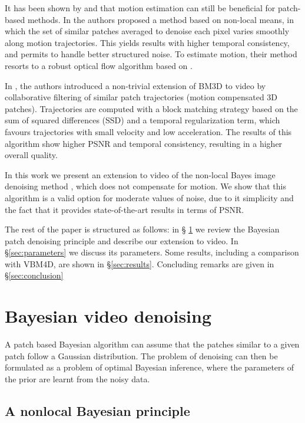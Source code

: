 \documentclass{llncs}
\begin{document}
It has been shown by \cite{Liu2010} and \cite{Maggioni2011,Maggioni2012} that motion estimation can still be
beneficial for patch-based methods. 
%
In \cite{Liu2010} the authors proposed a method based on non-local means, in which the set of
similar patches averaged to denoise each pixel varies smoothly along motion
trajectories. This yields results with higher temporal consistency, and
permits to handle better structured noise. To estimate motion, their method resorts
to a robust optical flow algorithm based on \cite{Bruhn2005}.

In \cite{Maggioni2011,Maggioni2012}, the authors introduced a non-trivial extension of BM3D to video by
collaborative filtering of similar patch trajectories (motion compensated 3D
patches). Trajectories are computed with a block matching strategy based on the
sum of squared differences (SSD) and a temporal regularization term, which
favours trajectories with small velocity and low acceleration. The results of this
algorithm show higher PSNR and temporal consistency, resulting in a higher
overall quality.


\bigskip

In this work we present an extension to video of the non-local Bayes image
denoising method \cite{Lebrun2013a,Lebrun2013ipol}, which does not compensate for motion. We
show that this algorithm is a valid option for moderate values of noise, due 
to it simplicity and the fact that it provides state-of-the-art results in
terms of PSNR.

The rest of the paper is structured as follows: in \S
\ref{sec:review_nonlocal_Bayes} we review the Bayesian patch denoising principle 
and describe our extension to video. In \S \ref{sec:parameters}
we discuss its parameters. Some results, including a comparison with VBM4D, are shown
in \S \ref{sec:results}. Concluding remarks are given in \S \ref{sec:conclusion}

\section{Bayesian video denoising}
\label{sec:review_nonlocal_Bayes}

A patch based Bayesian algorithm can assume that the patches similar to a given
patch follow a Gaussian distribution.
The problem 
of denoising can then be formulated as a problem of optimal Bayesian inference, where the
parameters of the prior are learnt from the noisy data.

\subsection{A nonlocal Bayesian principle}
\end{document}
